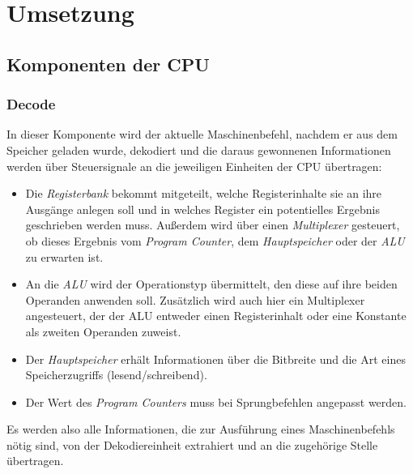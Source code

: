 \iffalse
\TODO: RAM im code umbenennen
\TDOD: Probleme: RAM
\TODO: Komponente Main
\TODO: Probleme: ALU und Decode erst clk-sensitiv implementiert
\TODO: maschinenbefehle durchgehen: wurde etwas besonders implementiert?
\TODO: warum zwei Takte?
\TODO: latches
\TODO: synchrones design
\TODO: Register erklären?
\TODO: ALU zero-flag-next entfernen
\TODO: ELF, 
\fi

\chapter{Umsetzung} %
\label{Umsetzung} %

\section{Komponenten der CPU}

%


\iffalse
- Diagramm 
- sukzessive Entwicklung, per Maschinenbefehl
\fi
\subsection{Decode}



In dieser Komponente wird der aktuelle Maschinenbefehl, nachdem er aus dem Speicher geladen wurde, dekodiert und die daraus gewonnenen Informationen werden über Steuersignale an die jeweiligen Einheiten der CPU übertragen:
\begin{itemize}
    \item Die \textit{Registerbank} bekommt mitgeteilt, welche Registerinhalte sie an ihre Ausgänge anlegen soll und in welches Register ein potentielles Ergebnis geschrieben werden muss.
        Außerdem wird über einen \textit{Multiplexer} gesteuert, ob dieses Ergebnis vom \textit{Program Counter}, dem \textit{Hauptspeicher} oder der \textit{ALU} zu erwarten ist.
    \item An die \textit{ALU} wird der Operationstyp übermittelt, den diese auf ihre beiden Operanden anwenden soll.
        Zusätzlich wird auch hier ein Multiplexer angesteuert, der der ALU entweder einen Registerinhalt oder eine Konstante als zweiten Operanden zuweist.
    \item Der \textit{Hauptspeicher} erhält Informationen über die Bitbreite und die Art eines Speicherzugriffs (lesend/schreibend).
    \item Der Wert des \textit{Program Counters} muss bei Sprungbefehlen angepasst werden.
\end{itemize}
Es werden also alle Informationen, die zur Ausführung eines Maschinenbefehls nötig sind, von der Dekodiereinheit extrahiert und an die zugehörige Stelle übertragen. 

